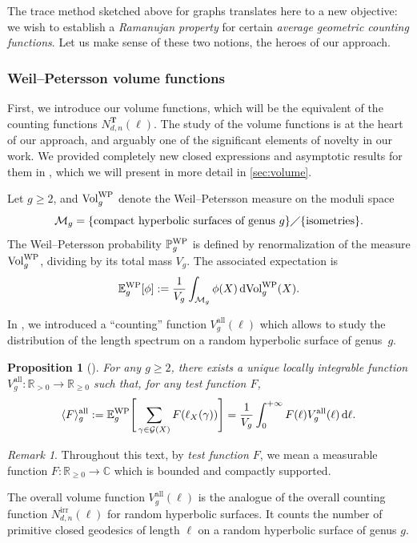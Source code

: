 \documentclass[12pt,twoside]{article}
\theoremstyle{theorem}
\newtheorem{prp}[thm]{Proposition}
\theoremstyle{remark}
\newtheorem{rem}[thm]{Remark}
\theoremstyle{definition}
\theoremstyle{example}
\newcommand{\R}{\mathbb{R}}
\newcommand{\C}{\mathbb{C}}
\renewcommand{\d}{\, \mathrm{d}}
\newcommand{\1}[1]{\mathds{1}_{#1}}
\newcommand{\cM}{\mathcal{M}}
\newcommand{\cG}{\mathcal{G}}
\newcommand{\Volwp}[1][g]{\mathrm{Vol}_{#1}^{\mathrm{\scriptsize{WP}}}}
\newcommand{\Pwpo}{\mathbb{P}_g^{\mathrm{\scriptsize{WP}}}}
\newcommand{\Ewpo}[1][g]{\mathbb{E}_{#1}^{\mathrm{\scriptsize{WP}}}}
\newcommand{\Ewp}[2][g]{\mathbb{E}_{#1}^{\mathrm{\scriptsize{WP}}} \Bigg[ #2 \Bigg]}
\newcommand{\type}{\mathbf{T}}
\newcommand{\av}[2][\mathrm{all}]{\langle #2 \rangle_g^{{#1}}}
\begin{document}
The trace method sketched above for graphs translates here to a new objective: we wish to establish
a \emph{Ramanujan property} for certain \emph{average geometric counting functions}. Let us make
sense of these two notions, the heroes of our approach.

\subsubsection{Weil--Petersson volume functions}
\label{sec:volume-functions-1}

First, we introduce our volume functions, which will be the equivalent of the counting functions
$N_{d,n}^\type(\ell)$. The study of the volume functions is at the heart of our approach, and
arguably one of the significant elements of novelty in our work. We provided completely new closed
expressions and asymptotic results for them in \cite{anantharaman2023,anantharaman2025}, which we
will present in more detail in \cref{sec:volume}.

Let $g \geq 2$, and $\Volwp$ denote the Weil--Petersson measure on the moduli space
\begin{equation}
  \label{eq:moduli}
  \cM_g = \{\text{compact hyperbolic surfaces of genus } g\} \diagup \{\text{isometries}\}.
\end{equation}
The Weil--Petersson probability $\Pwpo$ is defined by renormalization of the measure $\Volwp$,
dividing by its total mass $V_g$. The associated expectation is
\begin{equation}
  \Ewpo[g] [\phi]:=\frac{1}{V_g} \int_{\cM_g} \phi(X) \d \Volwp(X).
\end{equation}


In \cite{anantharaman2023}, we introduced a ``counting'' function $V_g^{\mathrm{all}}(\ell)$ which
allows to study the distribution of the length spectrum on a random hyperbolic surface of
genus~$g$. %

\begin{prp}[{\cite{anantharaman2023}}]
  For any $g \geq 2$, there exists a unique locally integrable function $V_g^{\mathrm{all}} :
  \R_{> 0} \rightarrow \R_{\geq 0}$ such that, for any test function $F$,
  \begin{equation}
    \av{F} := \Ewp{\sum_{\gamma \in \cG(X)} F(\ell_X(\gamma))}
    = \frac{1}{V_g} \int_0^{+ \infty} F(\ell) V_g^{\mathrm{all}}(\ell) \d \ell.
  \end{equation}
\end{prp}
\begin{rem}
  Throughout this text, by \emph{test function $F$}, we mean a measurable function
  $F: \R_{\geq 0} \rightarrow \C$ which is bounded and compactly supported.
\end{rem}
The overall volume function $V_g^{\mathrm{all}}(\ell)$ is the analogue of the overall counting
function $N_{d,n}^{\mathrm{irr}}(\ell)$ for random hyperbolic surfaces. It counts the number of
primitive closed geodesics of length $\ell$ on a random hyperbolic surface of genus $g$. 
\end{document}
